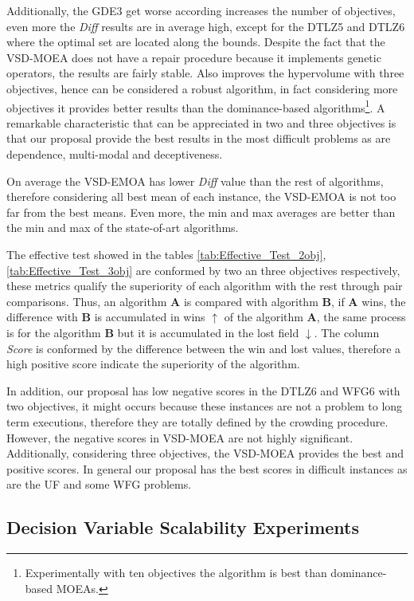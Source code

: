 %
Additionally, the GDE3 get worse according increases the number of objectives, even more the \textit{Diff} results are in average high, except for the DTLZ5 and DTLZ6 where the optimal set are located along the bounds.
%
Despite the fact that the VSD-MOEA does not have a repair procedure because it implements genetic operators, the results are fairly stable.
%
Also improves the hypervolume with three objectives, hence can be considered a robust algorithm, in fact considering more objectives it provides better results than the dominance-based algorithms\footnote{Experimentally with ten objectives the algorithm is best than dominance-based MOEAs.}.
%
A remarkable characteristic that can be appreciated in two and three objectives is that our  proposal provide the best results in the most difficult problems as are dependence, multi-modal and deceptiveness.

%
On average the VSD-EMOA has lower \textit{Diff} value than the rest of algorithms, therefore considering all best mean of each instance, the VSD-EMOA is not too far from the best means.
%
Even more, the min and max averages are better than the min and max of the state-of-art algorithms.
%

The effective test showed in the tables \ref{tab:Effective_Test_2obj}, \ref{tab:Effective_Test_3obj} are conformed by two an three objectives respectively,  these metrics qualify the superiority of each algorithm with the rest through pair comparisons.
%
Thus, an algorithm \textbf{A} is compared with algorithm \textbf{B}, if \textbf{A} wins, the difference with \textbf{B} is accumulated in wins $\uparrow$ of the algorithm \textbf{A}, the same process is for the algorithm \textbf{B} but it is accumulated in the lost field $\downarrow$.
%
The column \textit{Score} is conformed by the difference between the win and lost values, therefore a high positive score indicate the superiority of the algorithm.
%

In addition, our proposal has low negative scores in the DTLZ6 and WFG6 with two objectives, it might occurs because these instances are not a problem to long term executions, therefore they are totally defined by the crowding procedure.
%
However, the negative scores in VSD-MOEA are not highly significant.
%
Additionally, considering three objectives, the VSD-MOEA provides the best and positive scores.
%
In general our proposal has the best scores in difficult instances as are the UF and some WFG problems.



\subsection{Decision Variable Scalability Experiments}


